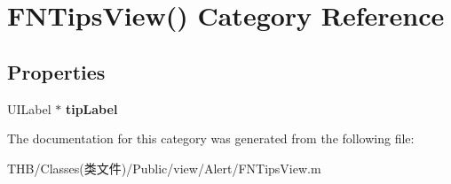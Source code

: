 \hypertarget{category_f_n_tips_view_07_08}{}\section{F\+N\+Tips\+View() Category Reference}
\label{category_f_n_tips_view_07_08}
\subsection*{Properties}
\begin{DoxyCompactItemize}
\item 
\mbox{\label{category_f_n_tips_view_07_08_a6c33f778e0604b2e493ebbf5735554b0}} 
U\+I\+Label $\ast$ {\bfseries tip\+Label}
\end{DoxyCompactItemize}


The documentation for this category was generated from the following file\+:\begin{DoxyCompactItemize}
\item 
T\+H\+B/\+Classes(类文件)/\+Public/view/\+Alert/F\+N\+Tips\+View.\+m\end{DoxyCompactItemize}
